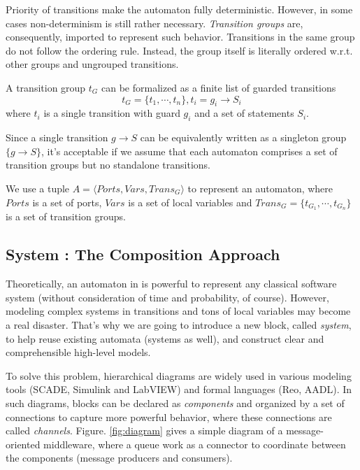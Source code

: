 Priority of transitions make the automaton fully deterministic. However, in some cases non-determinism is still rather necessary. \emph{Transition groups} are, consequently, imported to represent such behavior. Transitions in the same group do not follow the ordering rule. Instead, the group itself is literally ordered w.r.t. other groups and ungrouped transitions.

\begin{formalization}
    A transition group $t_G$ can be formalized as a finite list of guarded transitions
    \[
        t_G=\{t_1,\cdots, t_n\}, t_i=g_i\rightarrow S_i
    \]
    where $t_i$ is a single transition with guard $g_i$ and a set of statements $S_i$.
\end{formalization}

Since a single transition $g\rightarrow S$ can be equivalently written as a singleton group $\{g\rightarrow S\}$, it's acceptable if we assume that each automaton comprises a set of transition groups but no standalone transitions.

\begin{formalization}[Automata]
    We use a tuple $A=\langle Ports, Vars, Trans_G \rangle$ to represent an automaton, where $Ports$ is a set of ports, $Vars$ is a set of local variables and $Trans_G=\{t_{G_1},\cdots,t_{G_n}\}$ is a set of transition groups.
\end{formalization}

\subsection{System : The Composition Approach}
\label{subsec:system}

Theoretically, an automaton in \lang{} is powerful to represent any classical software system (without consideration of time and probability, of course). However, modeling complex systems in transitions and tons of local variables may become a real disaster. That's why we are going to introduce a new block, called \emph{system}, to help reuse existing automata (systems as well), and construct clear and comprehensible high-level models.

To solve this problem, hierarchical diagrams are widely used in various modeling tools (SCADE\cite{AbdullaISoLA2006,BerryScp1992}, Simulink and LabVIEW) and formal languages (Reo\cite{ArbabMscs2004}, AADL). In such diagrams, blocks can be declared as \emph{components} and organized by a set of connections to capture more powerful behavior, where these connections are called \emph{channels}. Figure. \ref{fig:diagram} gives a simple diagram of a message-oriented middleware, where a queue work as a connector to coordinate between the components (message producers and consumers).

